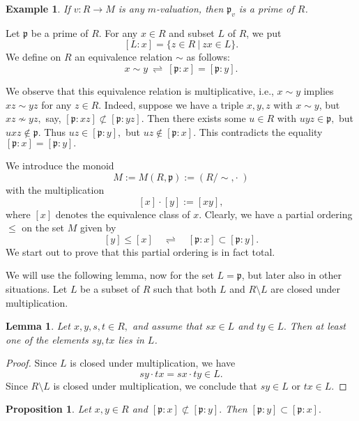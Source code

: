 \documentclass [12pt,a4paper,reqno]{amsart}
\newtheorem{lem}[thm]{Lemma}
\newtheorem{prop}[thm]{Proposition}
\newtheorem{example}[thm]{Example}
\begin{document}
\begin{example}\label{examp1.3}
If $v: R\to M$ is any $m$-valuation, then ${\mathfrak p}_v$ is a {prime} of
$R$.\end{example}

Let ${\mathfrak p}$ be a {prime} of $R$. For any $x\in R$ and subset $L$ of
$R$, we put
$$[L:x]=\{z\in R {\ {|} \ }zx\in L\}.$$
We define on $R$ an equivalence relation $\sim$ as follows:
$$x\sim y {\ {\rightleftharpoons} \ }[{\mathfrak p} :x]=[{\mathfrak p} :y].$$

We observe that this equivalence relation is multiplicative, i.e.,
$x\sim y$ implies $xz\sim yz$ for any $z\in R.$ Indeed, suppose we
have a triple $x,y,z$ with $x\sim y$, but $xz\not\sim yz,$ say,
$[{\mathfrak p} :xz]\not\subset [{\mathfrak p} :yz].$ Then there exists some $u\in
R$ with $uyz\in {\mathfrak p} ,$ but $uxz\notin {\mathfrak p}.$ Thus $uz\in[{\mathfrak p}
:y],$ but $uz\notin [{\mathfrak p} :x].$ This contradicts the equality
$[{\mathfrak p}:x]=[{\mathfrak p} :y].$

We introduce the monoid
$$M:=M (R,{\mathfrak p}):=(R/\sim,\cdot \; )$$
with the multiplication
$$[x]\cdot[y]:=[xy],$$
where $[x]$ denotes the equivalence class of $x$. Clearly, we have
a partial ordering $\le$ on the set $M$ given by
$$[y]\le[x] {\quad {\rightleftharpoons} \quad }[{\mathfrak p} :x]\subset [{\mathfrak p} :y].$$
We start out to prove that this partial ordering is in fact total.

We will use the following lemma, now for the set $L = {\mathfrak p}$, but
later also in other  situations.
 Let $L$ be a subset of $R$ such that both $L$ and $R \setminus L$
 are closed under multiplication.
\begin{lem}\label{lem1.4}
Let $x,y, s ,t\in R,$ and assume that $sx\in L $ and $ty\in L .$
Then at least one of the elements $sy,tx$ lies in $L$.\end{lem}

\begin{proof}
Since $L $ is closed under multiplication, we have
$$sy\cdot tx=sx\cdot ty\in L .$$
Since $R\setminus L $ is closed under multiplication, we conclude
that $sy\in L $ or $tx\in L .$\end{proof}

\begin{prop}\label{prop1.5}
Let $x,y\in R$ and $[{\mathfrak p} :x]\not\subset[{\mathfrak p} :y].$ Then $[{\mathfrak p}
:y]\subset [{\mathfrak p} :x].$
\end{prop}
\end{document}
